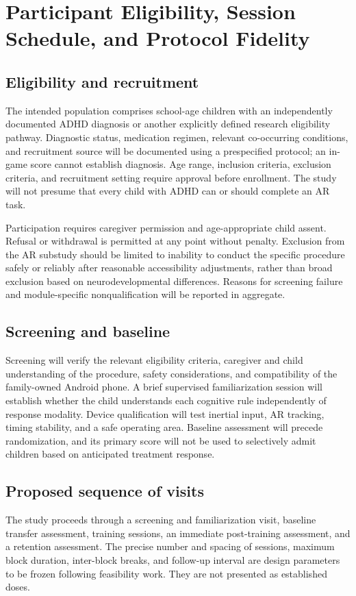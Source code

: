 \section{Participant Eligibility, Session Schedule, and Protocol Fidelity}

\subsection{Eligibility and recruitment}
The intended population comprises school-age children with an independently documented ADHD diagnosis or another explicitly defined research eligibility pathway. Diagnostic status, medication regimen, relevant co-occurring conditions, and recruitment source will be documented using a prespecified protocol; an in-game score cannot establish diagnosis. Age range, inclusion criteria, exclusion criteria, and recruitment setting require approval before enrollment. The study will not presume that every child with ADHD can or should complete an AR task.

Participation requires caregiver permission and age-appropriate child assent. Refusal or withdrawal is permitted at any point without penalty. Exclusion from the AR substudy should be limited to inability to conduct the specific procedure safely or reliably after reasonable accessibility adjustments, rather than broad exclusion based on neurodevelopmental differences. Reasons for screening failure and module-specific nonqualification will be reported in aggregate.

\subsection{Screening and baseline}
Screening will verify the relevant eligibility criteria, caregiver and child understanding of the procedure, safety considerations, and compatibility of the family-owned Android phone. A brief supervised familiarization session will establish whether the child understands each cognitive rule independently of response modality. Device qualification will test inertial input, AR tracking, timing stability, and a safe operating area. Baseline assessment will precede randomization, and its primary score will not be used to selectively admit children based on anticipated treatment response.

\subsection{Proposed sequence of visits}
The study proceeds through a screening and familiarization visit, baseline transfer assessment, training sessions, an immediate post-training assessment, and a retention assessment. The precise number and spacing of sessions, maximum block duration, inter-block breaks, and follow-up interval are design parameters to be frozen following feasibility work. They are not presented as established doses.

